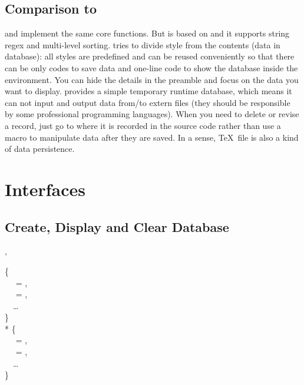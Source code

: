 \documentclass[full]{l3doc}
\begin{document}
\begin{documentation}
\subsection{Comparison to }


 and  implement the same core functions. But
 is based on  and it supports string regex and
multi-level sorting.  tries to divide style from the contents
(data in database): all styles are predefined and can be reused conveniently
so that there can be only codes to save data and one-line code to show the
database inside the  environment. You can hide the details in
the preamble and focus on the data you want to display.  provides
a simple temporary runtime database, which means it can not input and output
data from/to extern files (they should be responsible by some professional
programming languages). When you need to delete or revise a record, just go to
where it is recorded in the source code rather than use a macro to manipulate
data after they are saved. In a sense, \TeX~file is also a kind of data
persistence.

\section{Interfaces}

\subsection{Create, Display and Clear Database}

\begin{function}[added=2022-01-05]{\dbNewDatabase, \dbNewDatabase*}
  \begin{syntax}
       \{ \\
    ~~ = , \\
    ~~ = , \\
    ~~\ldots{} \\
    \} \\
    *  \{ \\
    ~~ = , \\
    ~~ = , \\
    ~~\ldots{} \\
    \} \\
  \end{syntax}


\end{function}
\end{documentation}
\end{document}
